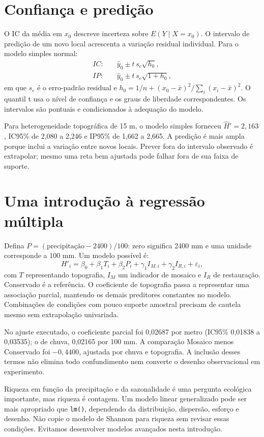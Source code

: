 \section{Confiança e predição}
O IC da média em $x_0$ descreve incerteza sobre $E(Y\mid X=x_0)$. O intervalo de predição de um novo local acrescenta a variação residual individual. Para o modelo simples normal:
\begin{align}
IC:\quad &\widehat y_0\pm t\,s_e\sqrt{h_0},\\
IP:\quad &\widehat y_0\pm t\,s_e\sqrt{1+h_0},
\end{align}
em que $s_e$ é o erro-padrão residual e $h_0=1/n+(x_0-\bar x)^2/\sum_i(x_i-\bar x)^2$. O quantil t usa o nível de confiança e os graus de liberdade correspondentes. Os intervalos são pontuais e condicionados à adequação do modelo.

Para heterogeneidade topográfica de 15 m, o modelo simples forneceu $\widehat H'=2{,}163$, IC95\% de 2,080 a 2,246 e IP95\% de 1,662 a 2,665. A predição é mais ampla porque inclui a variação entre novos locais. Prever fora do intervalo observado é extrapolar; mesmo uma reta bem ajustada pode falhar fora de sua faixa de suporte.

\section{Uma introdução à regressão múltipla}
Defina $P=(\text{precipitação}-2400)/100$: zero significa 2400 mm e uma unidade corresponde a 100 mm. Um modelo possível é:
\begin{equation}H'_i=\beta_0+\beta_1T_i+\beta_2P_i+
\gamma_1I_{M,i}+\gamma_2I_{R,i}+\varepsilon_i,\end{equation}
com $T$ representando topografia, $I_M$ um indicador de mosaico e $I_R$ de restauração. Conservado é a referência. O coeficiente de topografia passa a representar uma associação parcial, mantendo os demais preditores constantes no modelo. Combinações de condições com pouco suporte amostral precisam de cautela mesmo sem extrapolação univariada.

No ajuste executado, o coeficiente parcial foi 0,02687 por metro (IC95\% 0,01838 a 0,03535); o de chuva, 0,02165 por 100 mm. A comparação Mosaico menos Conservado foi $-0{,}4400$, ajustada por chuva e topografia. A inclusão desses termos não elimina todo confundimento nem converte o desenho observacional em experimento.

\begin{atencao}
Riqueza em função da precipitação e da sazonalidade é uma pergunta ecológica importante, mas riqueza é contagem. Um modelo linear generalizado pode ser mais apropriado que \texttt{lm()}, dependendo da distribuição, dispersão, esforço e desenho. Não copie o modelo de Shannon para riqueza sem revisar essas condições. Evitamos desenvolver modelos avançados nesta introdução.
\end{atencao}

